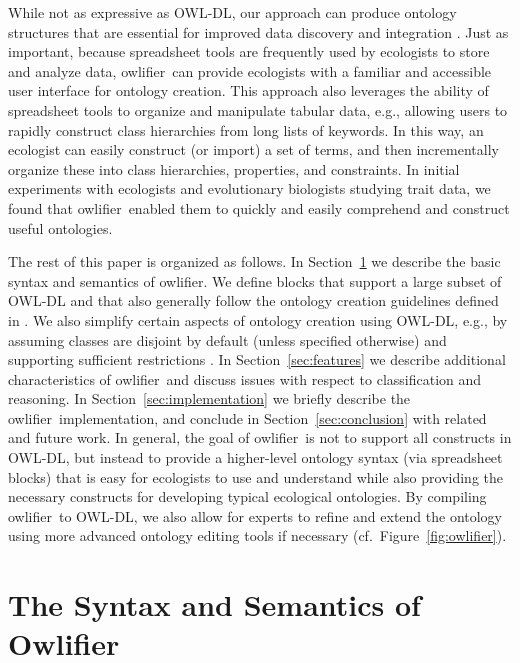 \documentclass[preprint,number]{elsarticle}
\newcommand{\Owlifier}{\textsf{Owlifier}}
\newcommand{\owlifier}{\textsf{owlifier}}
\newcommand{\secref}[1]{Section~\ref{#1}}
\newcommand{\figref}[1]{Figure~\ref{#1}}
\begin{document}
While not as expressive as OWL-DL, our approach can produce ontology
structures that are essential for improved data discovery and
integration \cite{madin07:_ontol_for_descr_and_synth}. Just as
important, because spreadsheet tools are frequently used by ecologists
to store and analyze data, \owlifier\ can provide ecologists with a
familiar and accessible user interface for ontology creation. This
approach also leverages the ability of spreadsheet tools to organize
and manipulate tabular data, e.g., allowing users to rapidly construct
class hierarchies from long lists of keywords.  In this way, an
ecologist can easily construct (or import) a set of terms, and then
incrementally organize these into class hierarchies, properties, and
constraints. In initial experiments with ecologists and evolutionary
biologists studying trait data, we found that \owlifier\ enabled them
to quickly and easily comprehend and construct useful ontologies.

The rest of this paper is organized as follows. In
\secref{sec:owlifier} we describe the basic syntax and semantics of
\owlifier. We define blocks that support a large subset of OWL-DL and
that also generally follow the ontology creation guidelines defined in
\cite{rector04:_owl_pizzas}. We also simplify certain aspects of
ontology creation using OWL-DL, e.g., by assuming classes are disjoint
by default (unless specified otherwise) and supporting sufficient
restrictions \cite{rector04:_owl_pizzas}. In \secref{sec:features} we
describe additional characteristics of \owlifier\ and discuss issues
with respect to classification and reasoning. In
\secref{sec:implementation} we briefly describe the \owlifier\
implementation, and conclude in \secref{sec:conclusion} with related
and future work. In general, the goal of \owlifier\ is not to support
all constructs in OWL-DL, but instead to provide a higher-level
ontology syntax (via spreadsheet blocks) that is easy for ecologists
to use and understand while also providing the necessary constructs
for developing typical ecological ontologies. By compiling \owlifier\
to OWL-DL, we also allow for experts to refine and extend the ontology
using more advanced ontology editing tools if necessary
(cf.~\figref{fig:owlifier}).



\section{The Syntax and Semantics of \Owlifier}
\label{sec:owlifier}
\end{document}
